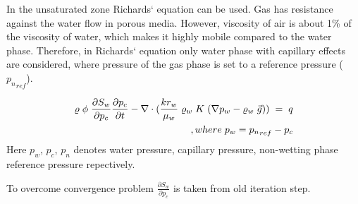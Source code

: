 In the unsaturated zone Richards` equation can be used. Gas has resistance against the water flow in porous media. However, viscosity of air is about 1\% of the viscosity of water, which makes it highly mobile compared to the water phase. Therefore, in Richards` equation only water phase with capillary effects are considered, where pressure of the gas phase is set to a reference pressure (${p_n}_{ref}$).

\begin{align*} \varrho \hspace{1mm} \phi \hspace{1mm} \frac{\partial S_w}{\partial p_c} \frac{\partial p_c}{\partial t} - \nabla \cdot (\frac{kr_w}{\mu_w} \hspace{1mm} \varrho_w \hspace{1mm} K \hspace{1mm} (\nabla p_w - \varrho_w \hspace{1mm} \vec{g})) \hspace{1mm} = \hspace{1mm} q \\ ,where \hspace{1mm} p_w = {p_n}_{ref} - p_c \end{align*} Here $ p_w $, $ p_c $, $ p_n $ denotes water pressure, capillary pressure, non-wetting phase reference pressure repectively.

To overcome convergence problem $ \frac{\partial S_w}{\partial p_c} $ is taken from old iteration step. 
